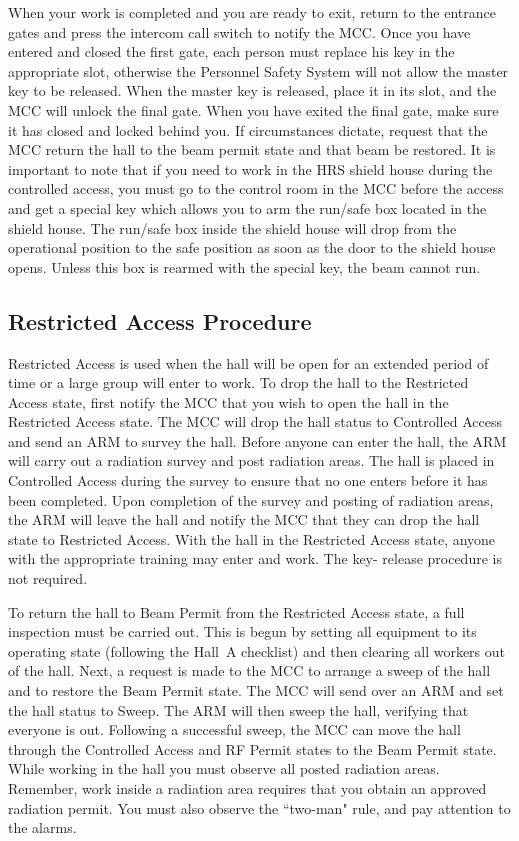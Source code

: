 When your work is completed and you are ready to exit, return to the
entrance gates and press the intercom call switch to notify the
MCC. Once you have entered and closed the first gate, each person must
replace his key in the appropriate slot, otherwise the Personnel
Safety System will not allow the master key to be released. When the
master key is released, place it in its slot, and the MCC will unlock
the final gate. When you have exited the final gate, make sure it has
closed and locked behind you. If circumstances dictate, request that
the MCC return the hall to the beam permit state and that beam be
restored.  It is important to note that if you need to work in the HRS
shield house during the controlled access, you must go to the control
room in the MCC before the access and get a special key which allows
you to arm the run/safe box located in the shield house. The run/safe
box inside the shield house will drop from the operational position to
the safe position as soon as the door to the shield house
opens. Unless this box is rearmed with the special key, the beam
cannot run.

\begin{safetyen}{10}{10}
\subsection{Restricted Access Procedure} 
\end{safetyen}

Restricted Access is used when the hall will be open for an extended
period of time or a large group will enter to work. To drop the hall
to the Restricted Access state, first notify the MCC that you wish to
open the hall in the Restricted Access state. The MCC will drop the
hall status to Controlled Access and send an ARM to survey the
hall. Before anyone can enter the hall, the ARM will carry out a
radiation survey and post radiation areas.  The hall is placed in
Controlled Access during the survey to ensure that no one enters
before it has been completed. Upon completion of the survey and
posting of radiation areas, the ARM will leave the hall and notify the
MCC that they can drop the hall state to Restricted Access. With the
hall in the Restricted Access state, anyone with the appropriate
training may enter and work.  The key- release procedure is not
required.
 
To return the hall to Beam Permit from the Restricted Access state, a
full inspection must be carried out. This is begun by setting all
equipment to its operating state (following the Hall~A checklist) and
then clearing all workers out of the hall. Next, a request is made to
the MCC to arrange a sweep of the hall and to restore the Beam Permit
state. The MCC will send over an ARM and set the hall status to Sweep.
The ARM will then sweep the hall, verifying that everyone is
out. Following a successful sweep, the MCC can move the hall through
the Controlled Access and RF Permit states to the Beam Permit state.
While working in the hall you must observe all posted radiation areas.
Remember, work inside a radiation area requires that you obtain an
approved radiation permit. You must also observe the ``two-man" rule,
and pay attention to the alarms.

